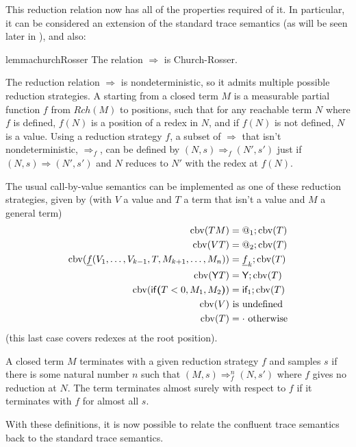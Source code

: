 \medskip
This reduction relation now has all of the properties required of it. In particular, it can be considered an extension of the standard trace semantics (as will be seen later in ), and also:
\begin{restatable}{lemma}{churchRosser} \label{churchRosser}
The relation $\Rightarrow$ is Church-Rosser.
\end{restatable}

\medskip
The reduction relation $\Rightarrow$ is nondeterministic, so it admits multiple possible reduction strategies. 
A  starting from a closed term $M$ is a measurable partial function $f$ from $\mathit{Rch}(M)$ to positions, such that for any reachable term $N$ where $f$ is defined, $f(N)$ is a position of a redex in $N$, and if $f(N)$ is not defined, $N$ is a value.
Using a reduction strategy $f$, a subset of $\Rightarrow$ that isn't nondeterministic, $\Rightarrow_f$, can be defined by $(N,s) \Rightarrow_f (N',s')$ just if $(N,s) \Rightarrow (N',s')$ and $N$ reduces to $N'$ with the redex at $f(N)$.

The usual call-by-value semantics can be implemented as one of these reduction strategies, given by (with $V$ a value and $T$ a term that isn't a value and $M$ a general term)
\begin{align*}
\operatorname{cbv}(T M) & = @_1 ; \operatorname{cbv}(T) \\
\operatorname{cbv}(V T) & = @_2 ; \operatorname{cbv}(T) \\
\operatorname{cbv}(\underline f(V_1, \dots, V_{k-1}, T, M_{k+1}, \dots, M_n)) & = \underline f_k ; \operatorname{cbv}(T) \\
\operatorname{cbv}(\mathsf{Y} T) & = \mathsf{Y} ; \operatorname{cbv}(T) \\
\operatorname{cbv}(\mathsf{if}\boldsymbol{(}T < 0, M_1, M_2\boldsymbol{)}) & = \textsf{if}_1 ; \operatorname{cbv}(T) \\
\operatorname{cbv}(V) & \text{ is undefined} \\
\operatorname{cbv}(T) & = \cdot \text{ otherwise}
\end{align*}
(this last case covers redexes at the root position).

A closed term $M$ terminates with a given reduction strategy $f$ and samples $s$ if there is some natural number $n$ such that $(M,s) \Rightarrow_f^n (N,s')$ where $f$ gives no reduction at $N$. 
The term terminates almost surely with respect to $f$ if it terminates with $f$ for almost all $s$.

With these definitions, it is now possible to relate the confluent trace semantics back to the standard trace semantics.

